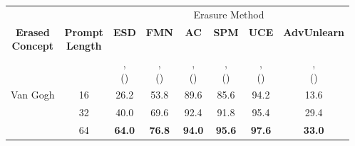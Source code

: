 \begin{tabular}{c|c|c|c|c|c|c|c}
    \toprule
     && \multicolumn{6}{c}{Erasure Method} \\
        \cmidrule(lr){3-8} 
        \shortstack{\textbf{Erased}\\\textbf{Concept}}
        &\shortstack{\textbf{Prompt}\\\textbf{Length}}& \textbf{ESD} & \textbf{FMN} & \textbf{AC} & \textbf{SPM} & \textbf{UCE} & \textbf{AdvUnlearn} \\
        && \shortstack{\citeauthor{gandikotaErasingConceptsDiffusion2023}, \\ (\citeyear{gandikotaErasingConceptsDiffusion2023})} & \shortstack{\citeauthor{zhangForgetmenotLearningForget2024}, \\ (\citeyear{zhangForgetmenotLearningForget2024})} & \shortstack{\citeauthor{kumariAblatingConceptsTexttoimage2023}, \\ (\citeyear{kumariAblatingConceptsTexttoimage2023})} & \shortstack{\citeauthor{lyuOnedimensionalAdapterRule2024}, \\ (\citeyear{lyuOnedimensionalAdapterRule2024})} & \shortstack{\citeauthor{gandikotaUnifiedConceptEditing2023}, \\ (\citeyear{gandikotaUnifiedConceptEditing2023})} & \shortstack{\citeauthor{zhangDefensiveUnlearningAdversarial2024}, \\ (\citeyear{zhangDefensiveUnlearningAdversarial2024})}\\
        \midrule
        \multirow{3}{*}{Van Gogh}         
        & 16 & 26.2 & 53.8 & 89.6 & 85.6 & 94.2 & 13.6 \\
        & 32 & 40.0 & 69.6 & 92.4 & 91.8 & 95.4 & 29.4 \\
        & 64 & \textbf{64.0} & \textbf{76.8} & \textbf{94.0} & \textbf{95.6} & \textbf{97.6} & \textbf{33.0} \\
        \bottomrule

    \end{tabular}